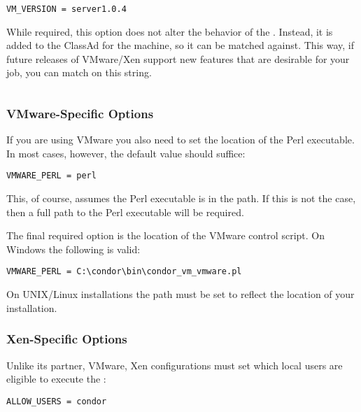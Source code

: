 \begin{verbatim}
VM_VERSION = server1.0.4
\end{verbatim}

While required, this option does not alter the behavior of the 
. Instead, it is added to the ClassAd for the machine, so it 
can be matched against.  This way, if future releases of VMware/Xen support
new features that are desirable for your job, you can match on this string.

\begin{verbatim}
\end{verbatim}

\subsubsection{VMware-Specific Options}

If you are using VMware you also need to set the location of the Perl 
executable.  In most cases, however, the default value should suffice:

\begin{verbatim}
VMWARE_PERL = perl
\end{verbatim}

This, of course, assumes the Perl executable is in the path.  If this is not 
the case, then a full path to the Perl executable will be required.

The final required option is the location of the VMware control script. On 
Windows the following is valid:

\begin{verbatim}
VMWARE_PERL = C:\condor\bin\condor_vm_vmware.pl
\end{verbatim}

On UNIX/Linux installations the path must be set to reflect the location of
your installation.

\subsubsection{Xen-Specific Options}

Unlike its partner, VMware, Xen configurations must set which local users 
are eligible to execute the :

\begin{verbatim}
ALLOW_USERS = condor
\end{verbatim}

